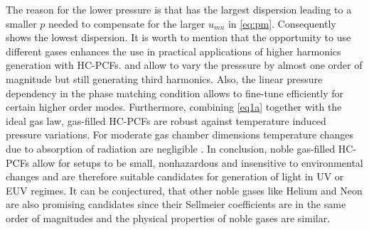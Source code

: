 \documentclass[fleqn, 10pt, twocolumn]{SelfArx}
\begin{document}
    The reason for the lower pressure is that  has the largest dispersion \cite{Borzsonyi2008} leading to a smaller $p$ needed to compensate for the larger $u_{mn}$ in \eqref{eq:pm}.
    Consequently  shows the lowest dispersion.
    It is worth to mention that the opportunity to use different gases enhances the use in practical applications of higher harmonics generation with HC-PCFs. 
     and  allow to vary the presssure by almost one order of magnitude but still generating third harmonics. Also, the linear pressure dependency in the phase matching condition
    allows to fine-tune efficiently for certain higher order modes.
    Furthermore, combining \eqref{eq1a} together with the ideal gas law, gas-filled HC-PCFs are robust against temperature induced pressure variations. For moderate gas chamber dimensions temperature changes due to absorption of radiation are negligible \cite{Serebryannikov2004}.
    In conclusion, noble gas-filled HC-PCFs allow for setups to be small, nonhazardous and insensitive to environmental changes and are therefore 
    suitable candidates for generation of light in UV or EUV regimes.
    It can be conjectured, that other noble gases like Helium and Neon are also promising candidates since their Sellmeier coefficients are in the same order of magnitudes and the physical properties of noble gases are similar. 

    \printbibliography
\end{document}

